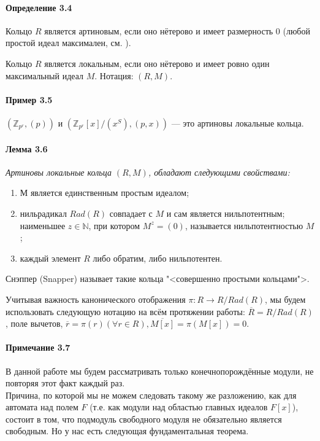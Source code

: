 \documentclass[a4paper,12pt]{article}
\begin{document}
\paragraph{Определение 3.4}
Кольцо $R$ является артиновым, если оно нётерово и имеет размерность 0 (любой простой идеал максимален, см. \cite{bib1}).

Кольцо $R$ является локальным, если оно нётерово и имеет ровно один максимальный идеал $M$. Нотация: $(R,M)$.

\paragraph{Пример 3.5}
$(\mathbb{Z}_{p^r}, (p))$ и $(\mathbb{Z}_{p^r}[x]/(x^S), (p,x))$ --- это артиновы локальные кольца.

\paragraph{Лемма 3.6}{\itshape
Артиновы локальные кольца $(R,M)$, обладают следующими свойствами:
}

\renewcommand{\labelenumi}{(\asbuk{enumi})}
\begin{enumerate}
	\item М является единственным простым идеалом;
	\item нильрадикал $Rad(R)$ совпадает с $M$ и сам является нильпотентным; наименьшее $z \in \mathbb{N}$, при котором $M^z = (0)$, называется нильпотентностью $M$;
	\item каждый элемент $R$ либо обратим, либо нильпотентен.
\end{enumerate}

Снэппер (Snapper) \cite{bib11} называет такие кольца "<совершенно простыми кольцами">.

Учитывая важность канонического отображения $\pi : R \rightarrow R / Rad(R)$, мы будем использовать следующую нотацию на всём протяжении работы: $\overline{R} = R / Rad(R)$, поле вычетов, $\overline{r} = \pi (r) (\forall r \in R), \overline{M[x]} = \pi (M[x]) = 0$.

\paragraph{Примечание 3.7}
В данной работе мы будем рассматривать только конечнопорождённые модули, не повторяя этот факт каждый раз.\\

Причина, по которой мы не можем следовать такому же разложению, как для автомата над полем $F$ (т.е. как модули над областью главных идеалов $F[x]$), состоит в том, что подмодуль свободного модуля не обязательно является свободным. Но у нас есть следующая фундаментальная теорема.
\end{document}
